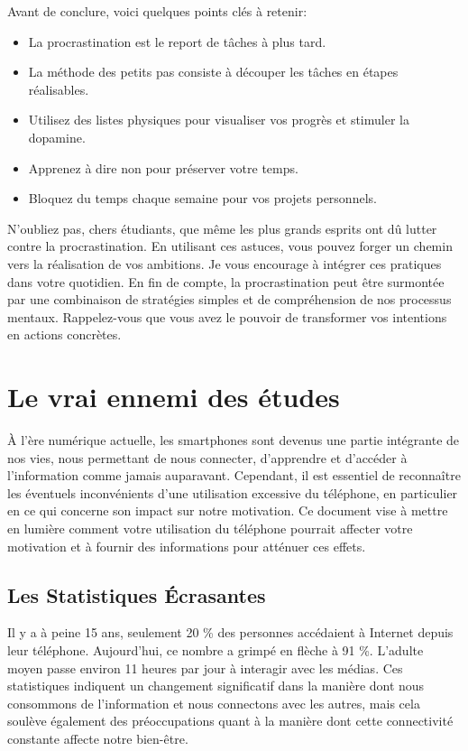 \documentclass[a4paper, 10pt, garamond]{book}
\begin{document}
Avant de conclure, voici quelques points clés à retenir:
\begin{itemize}
	\item La procrastination est le report de tâches à plus tard.
	\item La méthode des petits pas consiste à découper les tâches en étapes
	      réalisables.
	\item Utilisez des listes physiques pour visualiser vos progrès et stimuler la
	      dopamine.
	\item Apprenez à dire non pour préserver votre temps.
	\item Bloquez du temps chaque semaine pour vos projets personnels.
\end{itemize}

N'oubliez pas, chers étudiants, que même les plus grands esprits ont dû lutter
contre la procrastination. En utilisant ces astuces, vous pouvez forger un
chemin vers la réalisation de vos ambitions. Je vous encourage à intégrer ces
pratiques dans votre quotidien. En fin de compte, la procrastination peut être
surmontée par une combinaison de stratégies simples et de compréhension de nos
processus mentaux. Rappelez-vous que vous avez le pouvoir de transformer vos
intentions en actions concrètes.

\chapter{Le vrai ennemi des études}


À l'ère numérique actuelle, les smartphones sont devenus une partie intégrante
de nos vies, nous permettant de nous connecter, d'apprendre et d'accéder à
l'information comme jamais auparavant. Cependant, il est essentiel de
reconnaître les éventuels inconvénients d'une utilisation excessive du
téléphone, en particulier en ce qui concerne son impact sur notre motivation. Ce
document vise à mettre en lumière comment votre utilisation du téléphone
pourrait affecter votre motivation et à fournir des informations pour atténuer
ces effets.

\section{Les Statistiques Écrasantes}

Il y a à peine 15 ans, seulement 20 \% des personnes accédaient à Internet
depuis leur téléphone. Aujourd'hui, ce nombre a grimpé en flèche à 91 \%.
L'adulte moyen passe environ 11 heures par jour à interagir avec les médias. Ces
statistiques indiquent un changement significatif dans la manière dont nous
consommons de l'information et nous connectons avec les autres, mais cela
soulève également des préoccupations quant à la manière dont cette connectivité
constante affecte notre bien-être.
\end{document}
